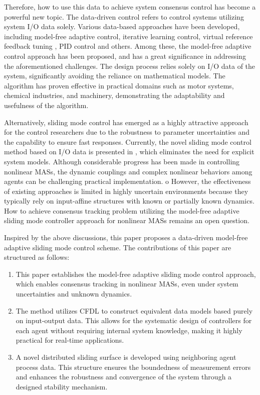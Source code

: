 \documentclass[journal,onecolumn]{IEEEtran}
\begin{document}
Therefore, how to use this data to achieve system consensus control has become a powerful new topic. The data-driven control \cite{17,18,19,20} refers to control systems utilizing system I/O data solely. Various data-based approaches have been developed, including model-free adaptive control, iterative learning control, virtual reference feedback tuning \cite{21}, PID control \cite{22} and others. Among these,  the model-free adaptive control approach \cite{23,24,25} has been proposed, and has a great significance in addressing the aforementioned challenges. The design process relies solely on I/O data of the system, significantly avoiding the reliance on mathematical models. The algorithm has proven effective in practical domains such as motor systems, chemical industries, and machinery, demonstrating the adaptability and usefulness of the algorithm. 

Alternatively, sliding mode control \cite{26} has emerged as a highly attractive approach for the control researchers due to the robustness to parameter uncertainties and the capability to ensure fast responses. Currently, the novel sliding mode control method based on I/O data is presented in \cite{27}, which eliminates the need for explicit system models. 
Although considerable progress has been made in controlling nonlinear MASs, the dynamic couplings and complex nonlinear behaviors among agents \cite{14} can be challenging practical implementation.
o
However, the effectiveness of existing approaches \cite{31,32,33,34} is limited in highly uncertain environments because they typically rely on input-affine structures with known or partially known dynamics.
How to achieve consensus tracking problem utilizing the model-free adaptive sliding mode controller approach for nonlinear MASs remains an open question.

Inspired by the above discussions, this paper proposes a data-driven model-free adaptive sliding mode control scheme. The contributions of this paper are structured as follows:

\begin{enumerate}

    \item This paper establishes the model-free adaptive sliding mode control approach, which enables consensus tracking in nonlinear MASs, even under system uncertainties and unknown dynamics.
    
    \item The method utilizes CFDL to construct equivalent data models based purely on input-output data. This allows for the systematic design of controllers for each agent without requiring internal system knowledge, making it highly practical for real-time applications.
    
    \item A novel distributed sliding surface is developed using neighboring agent process data. This structure ensures the boundedness of measurement errors and enhances the robustness and convergence of the system through a designed stability mechanism.

\end{enumerate}
\end{document}
